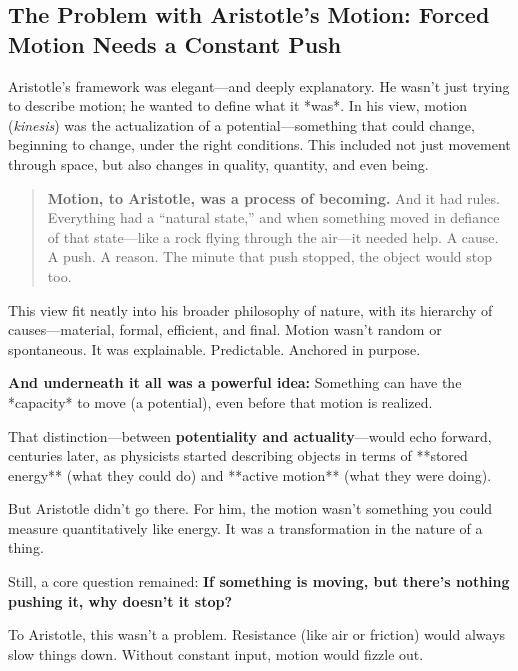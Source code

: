 \subsection{The Problem with Aristotle’s Motion: Forced Motion Needs a Constant Push}  

Aristotle’s framework was elegant—and deeply explanatory. He wasn’t just trying to describe motion; he wanted to define what it *was*. In his view, motion (\textit{kinesis}) was the actualization of a potential—something that could change, beginning to change, under the right conditions. This included not just movement through space, but also changes in quality, quantity, and even being.  

\begin{quote}
\textbf{Motion, to Aristotle, was a process of becoming.}  And it had rules. Everything had a “natural state,” and when something moved in defiance of that state—like a rock flying through the air—it needed help. A cause. A push. A reason. The minute that push stopped, the object would stop too.  
\end{quote}

This view fit neatly into his broader philosophy of nature, with its hierarchy of causes—material, formal, efficient, and final. Motion wasn’t random or spontaneous. It was explainable. Predictable. Anchored in purpose.

\textbf{And underneath it all was a powerful idea:}  Something can have the *capacity* to move (a potential), even before that motion is realized.  

That distinction—between \textbf{potentiality and actuality}—would echo forward, centuries later, as physicists started describing objects in terms of **stored energy** (what they could do) and **active motion** (what they were doing).  

But Aristotle didn’t go there. For him, the motion wasn’t something you could measure quantitatively like energy. It was a transformation in the nature of a thing.  

Still, a core question remained: \textbf{If something is moving, but there’s nothing pushing it, why doesn’t it stop?}

To Aristotle, this wasn’t a problem. Resistance (like air or friction) would always slow things down. Without constant input, motion would fizzle out.  

